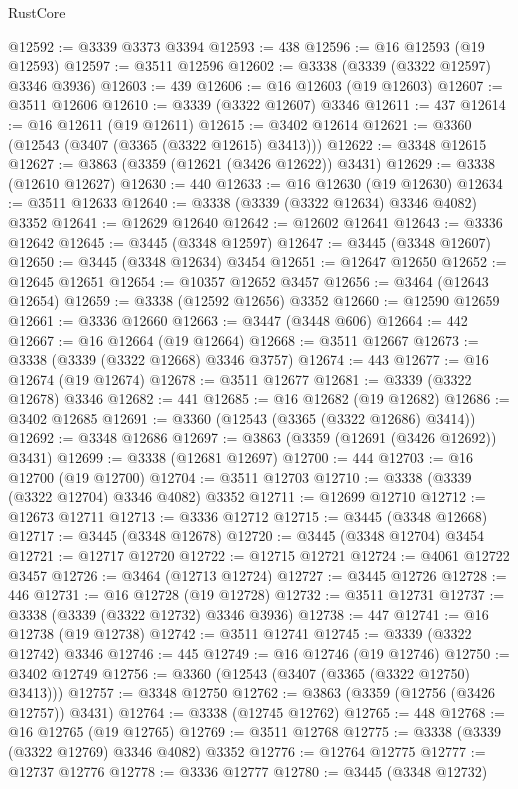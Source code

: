 \begin{lexlean}{RustCore}
\begin{coremodule}
@12592 := @3339 @3373 @3394
@12593 := 438
@12596 := @16 @12593 (@19 @12593)
@12597 := @3511 @12596
@12602 := @3338 (@3339 (@3322 @12597) @3346 @3936)
@12603 := 439
@12606 := @16 @12603 (@19 @12603)
@12607 := @3511 @12606
@12610 := @3339 (@3322 @12607) @3346
@12611 := 437
@12614 := @16 @12611 (@19 @12611)
@12615 := @3402 @12614
@12621 := @3360 (@12543 (@3407 (@3365 (@3322 @12615) @3413)))
@12622 := @3348 @12615
@12627 := @3863 (@3359 (@12621 (@3426 @12622)) @3431)
@12629 := @3338 (@12610 @12627)
@12630 := 440
@12633 := @16 @12630 (@19 @12630)
@12634 := @3511 @12633
@12640 := @3338 (@3339 (@3322 @12634) @3346 @4082) @3352
@12641 := @12629 @12640
@12642 := @12602 @12641
@12643 := @3336 @12642
@12645 := @3445 (@3348 @12597)
@12647 := @3445 (@3348 @12607)
@12650 := @3445 (@3348 @12634) @3454
@12651 := @12647 @12650
@12652 := @12645 @12651
@12654 := @10357 @12652 @3457
@12656 := @3464 (@12643 @12654)
@12659 := @3338 (@12592 @12656) @3352
@12660 := @12590 @12659
@12661 := @3336 @12660
@12663 := @3447 (@3448 @606)
@12664 := 442
@12667 := @16 @12664 (@19 @12664)
@12668 := @3511 @12667
@12673 := @3338 (@3339 (@3322 @12668) @3346 @3757)
@12674 := 443
@12677 := @16 @12674 (@19 @12674)
@12678 := @3511 @12677
@12681 := @3339 (@3322 @12678) @3346
@12682 := 441
@12685 := @16 @12682 (@19 @12682)
@12686 := @3402 @12685
@12691 := @3360 (@12543 (@3365 (@3322 @12686) @3414))
@12692 := @3348 @12686
@12697 := @3863 (@3359 (@12691 (@3426 @12692)) @3431)
@12699 := @3338 (@12681 @12697)
@12700 := 444
@12703 := @16 @12700 (@19 @12700)
@12704 := @3511 @12703
@12710 := @3338 (@3339 (@3322 @12704) @3346 @4082) @3352
@12711 := @12699 @12710
@12712 := @12673 @12711
@12713 := @3336 @12712
@12715 := @3445 (@3348 @12668)
@12717 := @3445 (@3348 @12678)
@12720 := @3445 (@3348 @12704) @3454
@12721 := @12717 @12720
@12722 := @12715 @12721
@12724 := @4061 @12722 @3457
@12726 := @3464 (@12713 @12724)
@12727 := @3445 @12726
@12728 := 446
@12731 := @16 @12728 (@19 @12728)
@12732 := @3511 @12731
@12737 := @3338 (@3339 (@3322 @12732) @3346 @3936)
@12738 := 447
@12741 := @16 @12738 (@19 @12738)
@12742 := @3511 @12741
@12745 := @3339 (@3322 @12742) @3346
@12746 := 445
@12749 := @16 @12746 (@19 @12746)
@12750 := @3402 @12749
@12756 := @3360 (@12543 (@3407 (@3365 (@3322 @12750) @3413)))
@12757 := @3348 @12750
@12762 := @3863 (@3359 (@12756 (@3426 @12757)) @3431)
@12764 := @3338 (@12745 @12762)
@12765 := 448
@12768 := @16 @12765 (@19 @12765)
@12769 := @3511 @12768
@12775 := @3338 (@3339 (@3322 @12769) @3346 @4082) @3352
@12776 := @12764 @12775
@12777 := @12737 @12776
@12778 := @3336 @12777
@12780 := @3445 (@3348 @12732)

\end{coremodule}
\end{lexlean}
